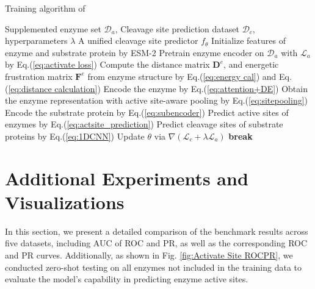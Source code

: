 \begin{algorithm}[H]
\caption{Training algorithm of {\method}}
\label{alg:unizyme}
\begin{algorithmic}[1]
\REQUIRE Supplemented enzyme set $\mathcal{D}_a$, Cleavage site prediction dataset $\mathcal{D}_c$, hyperparameters $\lambda$ 
\ENSURE A unified cleavage site predictor $f_{\theta}$ 
    \STATE Initialize features of enzyme and substrate protein by ESM-2
    \STATE Pretrain enzyme encoder on $\mathcal{D}_a$ with $\mathcal{L}_a$ by Eq.(\ref{eq:activate loss})
            \STATE Compute the distance matrix $\mathbf{D}^e$, and energetic frustration matrix $ \mathbf{F}^e$ from enzyme structure by Eq.(\ref{eq:energy cal}) and Eq.(\ref{eq:distance calculation})
            \STATE Encode the enzyme by Eq.(\ref{eq:attention+DE})
            \STATE Obtain the enzyme representation with active site-aware pooling by Eq.(\ref{eq:sitepooling})
            \STATE Encode the substrate protein by Eq.(\ref{eq:subencoder})
            \STATE Predict active sites of enzymes by Eq.(\ref{eq:actsite_prediction})
            \STATE Predict cleavage sites of substrate proteins by Eq.(\ref{eq:1DCNN})
            \STATE Update $\theta$ via $\nabla(\mathcal{L}_c + \lambda \mathcal{L}_a)$
        \ENDFOR
            \STATE \textbf{break}
        \ENDIF
    \ENDFOR
\end{algorithmic}
\end{algorithm}











\section{Additional Experiments and Visualizations }
\label{sec:app_exp}
In this section, we present a detailed comparison of the benchmark results across five datasets, including AUC of ROC and PR, as well as the corresponding ROC and PR curves. Additionally, as shown in Fig. \ref{fig:Activate Site ROCPR}, we conducted zero-shot testing on all enzymes not included in the training data to evaluate the model's capability in predicting enzyme active sites.


